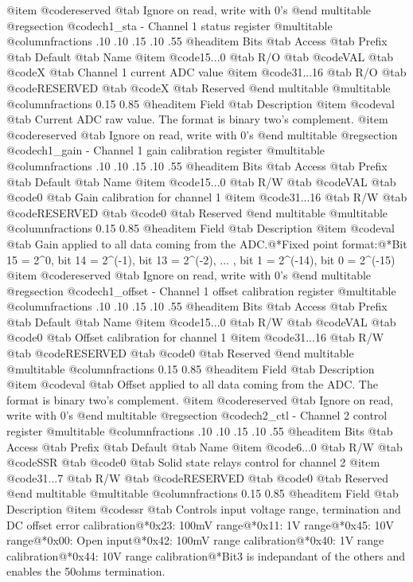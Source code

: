 @item @code{reserved} @tab Ignore on read, write with 0's
@end multitable
@regsection @code{ch1_sta} - Channel 1 status register
@multitable @columnfractions .10 .10 .15 .10 .55
@headitem Bits @tab Access @tab Prefix @tab Default @tab Name
@item @code{15...0}
@tab R/O @tab
@code{VAL}
@tab @code{X} @tab 
Channel 1 current ADC value
@item @code{31...16}
@tab R/O @tab
@code{RESERVED}
@tab @code{X} @tab 
Reserved
@end multitable
@multitable @columnfractions 0.15 0.85
@headitem Field @tab Description
@item @code{val} @tab Current ADC raw value. The format is binary two's complement.
@item @code{reserved} @tab Ignore on read, write with 0's
@end multitable
@regsection @code{ch1_gain} - Channel 1 gain calibration register
@multitable @columnfractions .10 .10 .15 .10 .55
@headitem Bits @tab Access @tab Prefix @tab Default @tab Name
@item @code{15...0}
@tab R/W @tab
@code{VAL}
@tab @code{0} @tab 
Gain calibration for channel 1
@item @code{31...16}
@tab R/W @tab
@code{RESERVED}
@tab @code{0} @tab 
Reserved
@end multitable
@multitable @columnfractions 0.15 0.85
@headitem Field @tab Description
@item @code{val} @tab Gain applied to all data coming from the ADC.@*Fixed point format:@*Bit 15 = 2^0, bit 14 = 2^(-1), bit 13 = 2^(-2), ... , bit 1 = 2^(-14), bit 0 = 2^(-15)
@item @code{reserved} @tab Ignore on read, write with 0's
@end multitable
@regsection @code{ch1_offset} - Channel 1 offset calibration register
@multitable @columnfractions .10 .10 .15 .10 .55
@headitem Bits @tab Access @tab Prefix @tab Default @tab Name
@item @code{15...0}
@tab R/W @tab
@code{VAL}
@tab @code{0} @tab 
Offset calibration for channel 1
@item @code{31...16}
@tab R/W @tab
@code{RESERVED}
@tab @code{0} @tab 
Reserved
@end multitable
@multitable @columnfractions 0.15 0.85
@headitem Field @tab Description
@item @code{val} @tab Offset applied to all data coming from the ADC. The format is binary two's complement.
@item @code{reserved} @tab Ignore on read, write with 0's
@end multitable
@regsection @code{ch2_ctl} - Channel 2 control register
@multitable @columnfractions .10 .10 .15 .10 .55
@headitem Bits @tab Access @tab Prefix @tab Default @tab Name
@item @code{6...0}
@tab R/W @tab
@code{SSR}
@tab @code{0} @tab 
Solid state relays control for channel 2
@item @code{31...7}
@tab R/W @tab
@code{RESERVED}
@tab @code{0} @tab 
Reserved
@end multitable
@multitable @columnfractions 0.15 0.85
@headitem Field @tab Description
@item @code{ssr} @tab Controls input voltage range, termination and DC offset error calibration@*0x23: 100mV range@*0x11: 1V range@*0x45: 10V range@*0x00: Open input@*0x42: 100mV range calibration@*0x40: 1V range calibration@*0x44: 10V range calibration@*Bit3 is indepandant of the others and enables the 50ohms termination.
